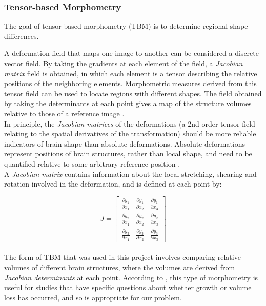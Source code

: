 \subsubsection{Tensor-based Morphometry}
The goal of tensor-based morphometry (TBM) is to determine regional
shape differences. 

A deformation field that maps one image to another can be considered a
discrete vector field. By taking the gradients at each element of the
field, a \textit{Jacobian matrix} field is obtained, in which each element is a
tensor describing the relative positions of the neighboring
elements. Morphometric measures derived from this tensor field can be
used to locate regions with different shapes. The field obtained by
taking the determinants at each point gives a map of the structure
volumes relative to those of a reference image \cite{ashburner2}.\\

In principle, the \textit{Jacobian matrices} of the deformations (a
2nd order tensor field relating to the spatial derivatives of the
transformation) should be more reliable indicators of brain shape than
absolute deformations. Absolute deformations represent positions of
brain structures, rather than local shape, and need to be quantified
relative to some arbitrary reference position \cite{ashburner}.\\

A \textit{Jacobian matrix} contains information about the local
stretching, shearing and rotation involved in the deformation, and is
defined at each point by:

\[
J = \begin{bmatrix}
  \frac{\partial y_1}{\partial x_1} & \frac{\partial y_1}{\partial x_2} & \frac{\partial y_1}{\partial x_3} \\[0.3em]
  \frac{\partial y_2}{\partial x_1} & \frac{\partial y_2}{\partial x_2} & \frac{\partial y_2}{\partial x_3} \\[0.3em]
  \frac{\partial y_3}{\partial x_1} & \frac{\partial y_3}{\partial x_2} & \frac{\partial y_3}{\partial x_3}
\end{bmatrix}
\]\\

The form of TBM that was used in this project involves comparing
relative volumes of different brain structures, where the volumes are
derived from \textit{Jacobian determinants} at each point. According
to \cite{ashburner}, this type of morphometry is useful for studies
that have specific questions about whether growth or volume loss has
occurred, and so is appropriate for our problem.\\

